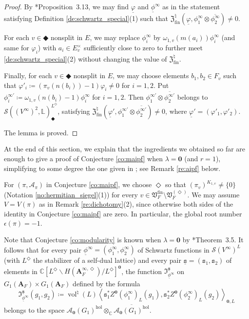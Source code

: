 \documentclass[12pt]{amsart}
\numberwithin{equation}{section}
\theoremstyle{plain}
\theoremstyle{definition}
\theoremstyle{remark}
\renewcommand{\b}[1]{\mathbf{#1}}
\renewcommand{\c}[1]{\mathcal{#1}}
\renewcommand{\d}[1]{\mathbb{#1}}
\newcommand{\f}[1]{\mathfrak{#1}}
\renewcommand{\r}[1]{\mathrm{#1}}
\newcommand{\s}[1]{\mathscr{#1}}
\renewcommand{\(}{\left(}
\renewcommand{\)}{\right)}
\newcommand{\ol}[1]{\overline{#1}{}}
\newcommand{\ul}{\underline}
\newcommand{\bA}{\b A}
\newcommand{\cA}{\c A}
\newcommand{\dC}{\d C}
\newcommand{\dL}{\d L}
\newcommand{\fI}{\f I}
\newcommand{\fV}{\f V}
\newcommand{\fZ}{\f Z}
\newcommand{\sS}{\s S}
\newcommand{\ts}{\mathtt{s}}
\newcommand{\llangle}{\left\langle}
\newcommand{\rrangle}{\right\rangle}
\newcommand{\fin}{\r{fin}}
\newcommand{\hol}{\r{hol}}
\DeclareMathOperator{\vol}{vol}
\begin{document}
\begin{proof}
By \cite{LL21}*{Proposition~3.13}, we may find $\ul\varphi$ and $\ul\phi^\infty$ as in the statement satisfying Definition \ref{de:schwartz_special}(1) such that $\fZ^\natural_\fin(\ul\varphi,\phi^\infty_1\otimes\ol{\phi^\infty_2})\neq 0$.

For each $v\in\Diamondblack$ nonsplit in $E$, we may replace $\phi^\infty_i$ by $\omega_{1,v}(m(a_i))\phi^\infty_i$ (and same for $\varphi_i$) with $a_i\in E_v^\times$ sufficiently close to zero to further meet \ref{de:schwartz_special}(2) without changing the value of $\fZ^\natural_\fin$.

Finally, for each $v\in\Diamondblack$ nonsplit in $E$, we may choose elements $b_1,b_2\in F_v$ such that $\varphi'_i\coloneqq(\pi_v(n(b_i))-1)\varphi_i\neq 0$ for $i=1,2$. Put $\phi^{\infty\prime}_i\coloneqq\omega_{1,v}(n(b_i)-1)\phi^\infty_i$ for $i=1,2$. Then $\phi^{\infty\prime}_1\otimes\ol{\phi^{\infty\prime}_2}$ belongs to $\sS((V^\infty)^2,\dL)^{L^\Diamond}_\Diamondblack$, satisfying $\fZ^\natural_\fin(\ul\varphi',\phi^{\infty\prime}_1\otimes\ol{\phi^{\infty\prime}_2})\neq 0$, where $\ul\varphi'=(\varphi'_1,\varphi'_2)$.

The lemma is proved.
\end{proof}



At the end of this section, we explain that the ingredients we obtained so far are enough to give a proof of Conjecture \ref{co:maipf} when $\lambda=\b{0}$ (and $r=1$), simplifying to some degree the one given in \cite{Liu12}; see Remark \ref{re:aipf} below.

For $(\pi,\cA_\pi)$ in Conjecture \ref{co:maipf}, we choose $\Diamond$ so that $(\pi_v)^{K_{1,v}}\neq\{0\}$ (Notation \ref{no:hermitian_siegel}(1)) for every $v\in\fV_F^{\fin}\setminus\fV_F^{(\Diamond)}$. We may assume $V=V(\pi)$ as in Remark \ref{re:dichotomy}(2), since otherwise both sides of the identity in Conjecture \ref{co:maipf} are zero. In particular, the global root number $\epsilon(\pi)=-1$.

Note that Conjecture \ref{co:modularity} is known when $\lambda=\b{0}$ by \cite{Liu11}*{Theorem~3.5}. It follows that for every pair $\ul\phi^\infty=(\phi^\infty_1,\phi^\infty_2)$ of Schwartz functions in $\sS(V^\infty)^L$ (with $L^\Diamond$ the stabilizer of a self-dual lattice) and every pair $\ul{\ts}=(\ts_1,\ts_2)$ of elements in $\dC[L^\Diamond\backslash H(\bA_F^{\infty,\Diamond})/L^\Diamond]^{\b{0}}$, the function $\fI_{\ul\phi^\infty}^{\ul{\ts}}$ on $G_1(\bA_F)\times G_1(\bA_F)$ defined by the formula
\[
\fI_{\ul\phi^\infty}^{\ul{\ts}}(g_1,g_2)\coloneqq\vol^\natural(L)
\llangle\ts_1^*Z^{\b{0}}(\phi^\infty_1)_L(g_1),\ts_2^*Z^{\b{0}}(\phi^\infty_2)_L(g_2)\rrangle_{\b{0},L}
\]
belongs to the space $\cA_{\b{0}}(G_1)^\hol\otimes_\dC\ol{\cA_{\b{0}}(G_1)^\hol}$.
\end{document}
